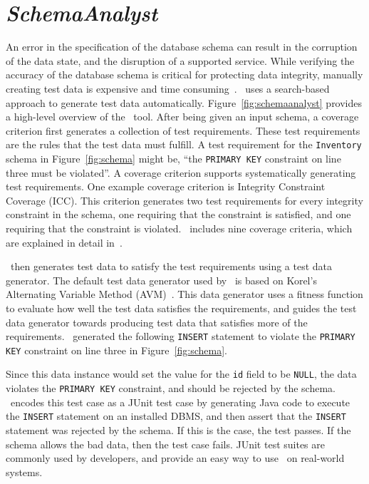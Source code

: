 \section{\textit{SchemaAnalyst}}\label{sec:technique}

An error in the specification of the database schema can result in the corruption of the data state, and the disruption
of a supported service.  While verifying the accuracy of the database schema is critical for protecting data integrity,
manually creating test data is expensive and time consuming~\cite{kapfhammer2013search}. \sa~uses a
search-based approach to generate test data automatically. Figure~\ref{fig:schemaanalyst} provides a high-level overview
of the \sa~tool.  After being given an input schema, a coverage criterion first generates a
collection of test requirements. These test requirements are the rules that the test data must fulfill. A test
requirement for the \texttt{Inventory} schema in Figure~\ref{fig:schema} might be, ``the \texttt{PRIMARY KEY} constraint
on line three must be violated''. A coverage criterion supports systematically generating test requirements. One example
coverage criterion is Integrity Constraint Coverage (ICC). This criterion generates two test requirements for every
integrity constraint in the schema, one requiring that the constraint is satisfied, and one requiring that the
constraint is violated. \sa~includes nine coverage criteria, which are explained in detail
in~\cite{mcminn2015effectiveness}.

\sa~then generates test data to satisfy the test requirements using a test data generator. The
default test data generator used by \sa~is based on Korel's Alternating Variable Method
(AVM)~\cite{Korel:AVM}.  This data generator uses a fitness function to evaluate how well the test data satisfies the
requirements, and guides the test data generator towards producing test data that satisfies more of the requirements.
\sa~generated the following \texttt{INSERT} statement to violate the \texttt{PRIMARY KEY} constraint
on line three in Figure~\ref{fig:schema}.



Since this data instance would set the value for the \texttt{id} field to be \texttt{NULL},
the data violates the \texttt{PRIMARY KEY} constraint, and should be rejected by the schema.
\sa~encodes this test case as a JUnit test case by generating Java code to execute
the \texttt{INSERT} statement on an installed DBMS, and then assert that the \texttt{INSERT} statement
was rejected by the schema. If this is the case, the test passes.  If the schema allows the bad data,
then the test case fails. JUnit test suites are commonly used by developers, and provide an easy way
to use \sa~on real-world systems.

